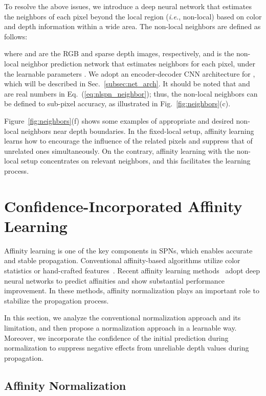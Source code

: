 \documentclass[runningheads]{llncs}
\newcommand{\figref}[1]{Fig.~\ref{#1}}
\newcommand{\eqnref}[1]{Eq.~(\ref{#1})}
\newcommand{\secref}[1]{Sec.~\ref{#1}}
\newcommand{\Figref}[1]{Figure~\ref{#1}}
\newcommand{\ie}{\textit{i.e.}}
\begin{document}
To resolve the above issues, we introduce a deep neural network that estimates the neighbors of each pixel beyond the local region (\ie, non-local) based on color and depth information within a wide area. 
The non-local neighbors  are defined as follows: 

where  and  are the RGB and sparse depth images, respectively, and  is the non-local neighbor prediction network that estimates  neighbors for each pixel, under the learnable parameters .
We adopt an encoder-decoder CNN architecture for , which will be described in \secref{subsec:net_arch}. 
It should be noted that  and  are real numbers in \eqnref{eq:nlspn_neighbor}; thus, the non-local neighbors can be defined to sub-pixel accuracy, as illustrated in \figref{fig:neighbors}(c).


\Figref{fig:neighbors}(f) shows some examples of appropriate and desired non-local neighbors near depth boundaries. 
In the fixed-local setup, affinity learning learns how to encourage the influence of the related pixels and suppress that of unrelated ones simultaneously.
On the contrary, affinity learning with the non-local setup concentrates on relevant neighbors, and this facilitates the learning process.




\section{Confidence-Incorporated Affinity Learning}
\label{sec:aff}

Affinity learning is one of the key components in SPNs, which enables accurate and stable propagation. 
Conventional affinity-based algorithms utilize color statistics or hand-crafted features~\cite{levin2006closed,saxena2006learning,krahenbuhl2011efficient}. 
Recent affinity learning methods~\cite{liu2015deep,liu2017learning,cheng2018depth} adopt deep neural networks to predict affinities and show substantial performance improvement.
In these methods, affinity normalization plays an important role to stabilize the propagation process. 

In this section, we analyze the conventional normalization approach and its limitation, and then propose a normalization approach in a learnable way. 
Moreover, we incorporate the confidence of the initial prediction during normalization to suppress negative effects from unreliable depth values during propagation.


\subsection{Affinity Normalization}
\label{subsec:aff_norm}
\end{document}
